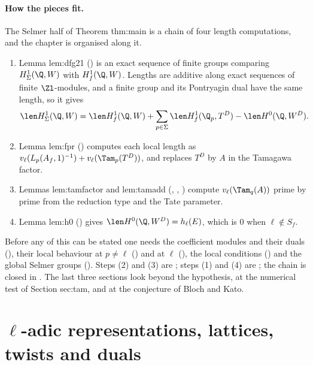 \paragraph{How the pieces fit.} The Selmer half of Theorem thm:main is a chain of four length computations, and the chapter is organised along it.
\begin{enumerate}[label=(\arabic*)]
\item Lemma lem:dfg21 () is an exact sequence of finite groups comparing $H^1_\Sigma(\Q,W)$ with $H^1_f(\Q,W)$. Lengths are additive along exact
sequences of finite $\Zl$-modules, and a finite group and its Pontryagin dual have the same length, so it gives
\[
\len H^1_\Sigma(\Q,W)=\len H^1_f(\Q,W)+\sum_{p\in\Sigma}\len H^1_f(\Q_p,T^D)-\len H^0(\Q,W^D).
\]
\item Lemma lem:fpr () computes each local length as $v_\ell(L_p(A_f,1)^{-1})+v_\ell(\Tam_p(T^D))$, and  replaces $T^D$ by $A$
in the Tamagawa factor.
\item Lemmas lem:tamfactor and lem:tamadd (, , ) compute $v_\ell(\Tam_q(A))$
prime by prime from the reduction type and the Tate parameter.
\item Lemma lem:h0 () gives $\len H^0(\Q,W^D)=h_\ell(E)$, which is $0$ when $\ell\notin S_f$.
\end{enumerate}
Before any of this can be stated one needs the coefficient modules and their duals (), their local behaviour at $p\ne\ell$
() and at $\ell$ (), the local conditions () and the global Selmer groups
(). Steps (2) and (3) are ; steps (1) and (4) are
; the chain is closed in . The last three sections look beyond the hypothesis, at the numerical test of
Section sec:tam, and at the conjecture of Bloch and Kato.

\section[\texorpdfstring{$\ell$}{l}-adic representations and duals]{\texorpdfstring{$\ell$}{l}-adic representations, lattices, twists and duals}\label{sec:blochkato:representations}

